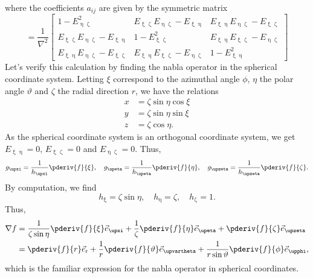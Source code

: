 where the coefficients $a_{ij}$ are given by the symmetric matrix
\begin{equation*}
	[a_{ij}] = \frac{1}{\nabla^2}\begin{bmatrix}
		1-E_{\upeta\upzeta}^2 & E_{\upxi\upzeta}E_{\upeta\upzeta} - E_{\upxi\upeta}  &  E_{\upxi\upeta}E_{\upeta\upzeta} - E_{\upxi\upzeta}\\
		E_{\upxi\upzeta}E_{\upeta\upzeta} - E_{\upxi\upeta} & 1-E_{\upxi\upzeta}^2 & E_{\upxi\upeta}E_{\upxi\upzeta} - E_{\upeta\upzeta}\\
		E_{\upxi\upeta}E_{\upeta\upzeta} - E_{\upxi\upzeta} & E_{\upxi\upeta}E_{\upxi\upzeta} - E_{\upeta\upzeta} & 1-E_{\upxi\upeta}^2
	\end{bmatrix}
\end{equation*}
Let's verify this calculation by finding the nabla operator in the spherical coordinate system. Letting $\xi$ correspond to the azimuthal angle $\phi$, $\eta$ the polar angle $\vartheta$ and $\zeta$ the radial direction $r$, we have the relations
\begin{align*}
	x &= \zeta\sin\eta\cos\xi\\
	y &= \zeta\sin\eta\sin\xi\\
	z &= \zeta\cos\eta.
\end{align*}
As the spherical coordinate system is an orthogonal coordinate system, we get $E_{\upxi\upeta}=0$, $E_{\upxi\upzeta}=0$ and $E_{\upeta\upzeta}=0$. Thus,
\begin{equation*}
	g_{\upxi} = \frac{1}{h_{\upxi}}\pderiv{f}{\xi},\quad g_{\upeta} =\frac{1}{h_{\upeta}}\pderiv{f}{\eta},\quad g_{\upzeta} =\frac{1}{h_{\upzeta}}\pderiv{f}{\zeta}.
\end{equation*}
By computation, we find
\begin{equation*}
	h_{\upxi} = \zeta\sin\eta,\quad h_{\upeta} = \zeta,\quad h_{\upzeta} = 1.
\end{equation*}
Thus,
\begin{align*}
	\nabla f &= \frac{1}{\zeta\sin\eta}\pderiv{f}{\xi}\vec{e}_{\upxi} + \frac{1}{\zeta}\pderiv{f}{\eta}\vec{e}_{\upeta} + \pderiv{f}{\zeta}\vec{e}_{\upzeta}\\
	&= \pderiv{f}{r}\vec{e}_{\mathrm{r}} + \frac{1}{r}\pderiv{f}{\vartheta}\vec{e}_{\upvartheta} + \frac{1}{r\sin\vartheta}\pderiv{f}{\phi}\vec{e}_{\upphi},
\end{align*}
which is the familiar expression for the nabla operator in spherical coordinates.


